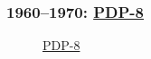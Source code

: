\documentclass[ignorenonframetext, hyperref=unicode]{beamer}
\begin{document}
\begin{frame}
\frametitle{1960--1970: \href{http://en.wikipedia.org/wiki/PDP-8}{PDP-8}}
\begin{figure}
\center
{}
\caption{\href{http://en.wikipedia.org/wiki/Image:PDP-8.jpg}{PDP-8}}
\end{figure}
\end{frame}
\end{document}
